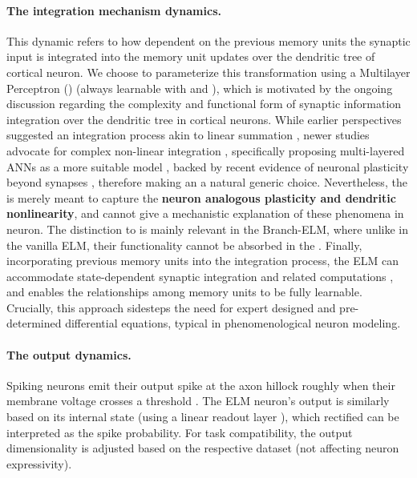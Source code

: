 \documentclass{article} \usepackage{iclr2024_doc_style,times}
\begin{document}
\paragraph{\textcolor{orangeVar}{The integration mechanism dynamics.}}
\label{the_integration_mechanism} 
This dynamic refers to how dependent on the previous memory units  the synaptic input  is integrated into the memory unit updates  over the dendritic tree of cortical neuron. We choose to parameterize this transformation using a Multilayer Perceptron () (always learnable with  and ), which is motivated by the ongoing discussion regarding the complexity and functional form of synaptic information integration over the dendritic tree in cortical neurons. While earlier perspectives suggested an integration process akin to linear summation \cite{jolivet2008quantitative}, newer studies advocate for complex non-linear integration \cite{almog2016realistic,gidon2020dendritic,larkum2022dendrites}, specifically proposing multi-layered ANNs as a more suitable model \cite{poirazi2003pyramidal,jadi2014augmented,tzilivaki2019challenging,marino_predictive_2021,jones2021might,jones2022biological,hodassman2022efficient}, backed by recent evidence of neuronal plasticity beyond synapses \cite{losonczy2008compartmentalized,holtmaat2009long,abraham2019plasticity}, therefore making an  a natural generic choice. Nevertheless, the  is merely meant to capture the \textbf{neuron analogous plasticity and dendritic nonlinearity}, and cannot give a mechanistic explanation of these phenomena in neuron. The distinction to  is mainly relevant in the Branch-ELM, where unlike in the vanilla ELM, their functionality cannot be absorbed in the . Finally, incorporating previous memory units  into the integration process, the ELM can accommodate state-dependent synaptic integration and related computations \cite{hodgkin1952quantitative,gasparini2006state,bicknell2021synaptic}, and enables the relationships among memory units  to be fully learnable. Crucially, this approach sidesteps the need for expert designed and pre-determined differential equations, typical in phenomenological neuron modeling. 

\paragraph{\textcolor{purpleVar}{The output dynamics.}} 
\label{the_output_dynamics}
Spiking neurons emit their output spike at the axon hillock roughly when their membrane voltage crosses a threshold \cite{kandel2000principles}. The ELM neuron's output is similarly based on its internal state  (using a linear readout layer ), which rectified can be interpreted as the spike probability. For task compatibility, the output dimensionality is adjusted based on the respective dataset (not affecting neuron expressivity).
\end{document}
